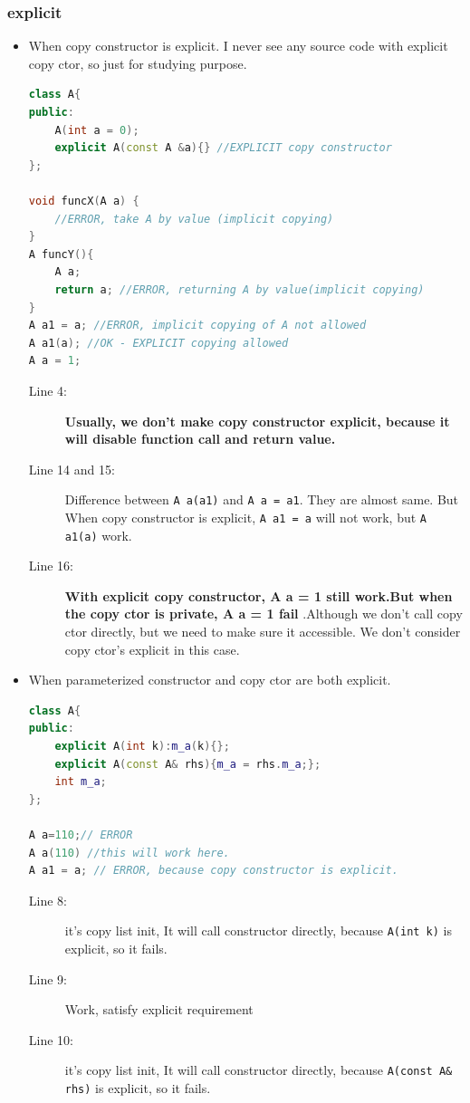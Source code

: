 \documentclass[a4paper,11pt,twoside]{book}
\begin{document}
\subsubsection{explicit}
\begin{itemize}
	\item When copy constructor is explicit. I never see any source code with explicit copy ctor, so just for studying purpose. 
\begin{lstlisting}[frame=single, language=c++]
class A{
public:
	A(int a = 0);
	explicit A(const A &a){} //EXPLICIT copy constructor
};
	
void funcX(A a) {
	//ERROR, take A by value (implicit copying)
}
A funcY(){ 
	A a;
	return a; //ERROR, returning A by value(implicit copying)
}
A a1 = a; //ERROR, implicit copying of A not allowed
A a1(a); //OK - EXPLICIT copying allowed
A a = 1;
\end{lstlisting}
	\begin{description}
		\item[Line 4:] \textbf{Usually, we don't make copy constructor explicit, because it will disable function call and return value.}
		
		\item[Line 14 and 15:] Difference between \texttt{A a(a1)} and \texttt{A a = a1}.  They are almost same. But When copy constructor is explicit,  \texttt{A a1 = a} will not work, but \texttt{A a1(a)} work.
		
		\item[Line 16:] \textbf{With explicit copy constructor, A a = 1 still work.But when the copy ctor is private, A a = 1 fail }.Although we don't call copy ctor directly, but we need to make sure it accessible. We don't consider copy ctor's explicit in this case.
	\end{description}
	
	\item When parameterized constructor and copy ctor are both explicit.
\begin{lstlisting}[frame=single, language=c++]
class A{
public:
	explicit A(int k):m_a(k){};
	explicit A(const A& rhs){m_a = rhs.m_a;};
	int m_a;
};
	
A a=110;// ERROR
A a(110) //this will work here.
A a1 = a; // ERROR, because copy constructor is explicit.
\end{lstlisting}
	\begin{description}
		\item[Line 8:] it's copy list init, It will call constructor directly, because \texttt{A(int k)} is explicit, so it fails.
		\item[Line 9:] Work, satisfy explicit requirement
		\item[Line 10:] it's copy list init, It will call constructor directly, because \texttt{A(const A\& rhs)} is explicit, so it fails.
	\end{description}
	

\end{itemize}
\end{document}
